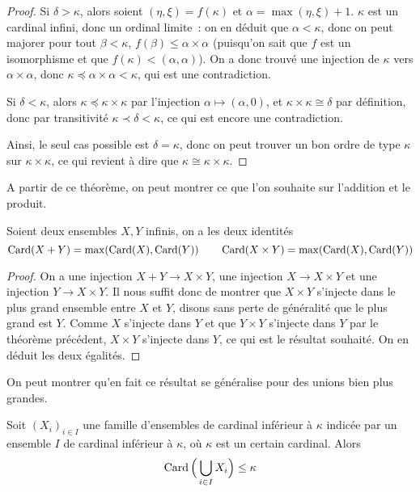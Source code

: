 \begin{proof}
  Si $\delta > \kappa$, alors soient $(\eta,\xi) = f(\kappa)$ et
  $\alpha = \max(\eta,\xi) + 1$. $\kappa$ est un cardinal infini, donc un
  ordinal limite~: on en déduit que $\alpha < \kappa$, donc on peut majorer pour
  tout $\beta < \kappa$, $f(\beta) \leq \alpha \times \alpha$ (puisqu'on sait
  que $f$ est un isomorphisme et que $f(\kappa) < (\alpha,\alpha)$). On a donc
  trouvé une injection de $\kappa$ vers $\alpha \times \alpha$, donc
  $\kappa \preceq \alpha\times \alpha < \kappa$, qui est une contradiction.

  Si $\delta < \kappa$, alors $\kappa \preceq \kappa \times \kappa$ par
  l'injection $\alpha \mapsto (\alpha, 0)$, et $\kappa\times\kappa \cong \delta$
  par définition, donc par transitivité $\kappa \prec \delta < \kappa$, ce
  qui est encore une contradiction.

  Ainsi, le seul cas possible est $\delta = \kappa$, donc on peut trouver un
  bon ordre de type $\kappa$ sur $\kappa\times\kappa$, ce qui revient à dire que
  $\kappa \cong \kappa\times\kappa$.
\end{proof}

A partir de ce théorème, on peut montrer ce que l'on souhaite sur l'addition
et le produit.

\begin{proposition}
  Soient deux ensembles $X,Y$ infinis, on a les deux identités
  \[\operatorname{Card}(X+Y) = \max(\operatorname{Card}(X),\operatorname{Card}(Y))\qquad
  \operatorname{Card}(X\times Y) = \max(\operatorname{Card}(X),\operatorname{Card}(Y))\]
\end{proposition}

\begin{proof}
  On a une injection $X+Y\to X\times Y$, une injection $X\to X\times Y$ et une
  injection $Y\to X\times Y$. Il nous suffit donc de montrer que
  $X\times Y$ s'injecte dans le plus grand ensemble entre $X$ et $Y$, disons
  sans perte de généralité que le plus grand est $Y$. Comme $X$ s'injecte dans
  $Y$ et que $Y\times Y$ s'injecte dans $Y$ par le théorème précédent,
  $X\times Y$ s'injecte dans $Y$, ce qui est le résultat souhaité. On en déduit
  les deux égalités.
\end{proof}

On peut montrer qu'en fait ce résultat se généralise pour des unions bien plus
grandes.

\begin{proposition}\label{prop.card.union}
  Soit $(X_i)_{i\in I}$ une famille d'ensembles de cardinal inférieur à
  $\kappa$ indicée par un ensemble $I$ de cardinal inférieur à $\kappa$, où
  $\kappa$ est un certain cardinal. Alors
  \[\operatorname{Card}\Big(\bigcup_{i\in I} X_i\Big)\leq \kappa\]
\end{proposition}

